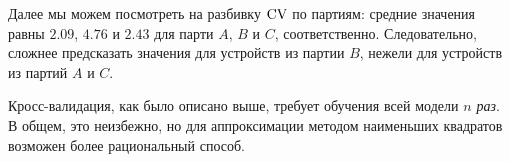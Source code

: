 Далее мы можем посмотреть на разбивку $\text{CV}$ по партиям: средние значения равны $2.09$, $4.76$ и $2.43$ для парти $A$, $B$ и $C$, соответственно. Следовательно, сложнее предсказать значения для устройств из партии $B$, нежели для устройств из партий $A$ и $C$. 

Кросс-валидация, как было описано выше, требует обучения всей модели \textit{$n$ раз}. В общем, это неизбежно, но для аппроксимации методом наименьших квадратов возможен более рациональный способ.


